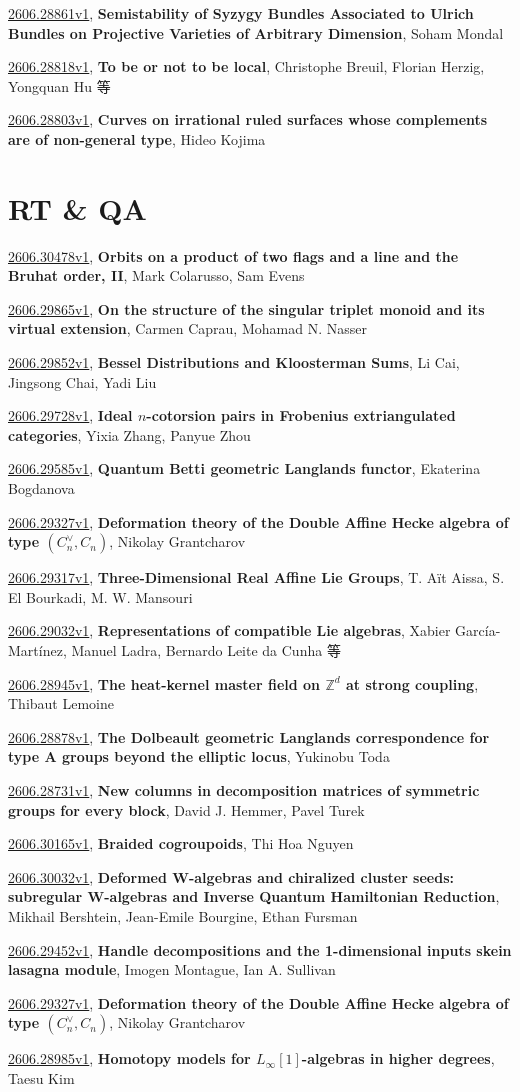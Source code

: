 \documentclass[9pt, a4paper]{article}
\theoremstyle{plain}
\theoremstyle{definition}
\theoremstyle{remark}
\newcommand{\arxiv}[3]{\href{https://arxiv.org/abs/#1}{#1}, \textbf{\textcolor{arxivblue}{#2}}, #3}
\begin{document}
\arxiv{2606.28861v1}{Semistability of Syzygy Bundles Associated to Ulrich Bundles on Projective Varieties of Arbitrary Dimension}{Soham Mondal}

\arxiv{2606.28818v1}{To be or not to be local}{Christophe Breuil, Florian Herzig, Yongquan Hu 等}

\arxiv{2606.28803v1}{Curves on irrational ruled surfaces whose complements are of non-general type}{Hideo Kojima}


\section{RT \& QA}
\arxiv{2606.30478v1}{Orbits on a product of two flags and a line and the Bruhat order, II}{Mark Colarusso, Sam Evens}

\arxiv{2606.29865v1}{On the structure of the singular triplet monoid and its virtual extension}{Carmen Caprau, Mohamad N. Nasser}

\arxiv{2606.29852v1}{Bessel Distributions and Kloosterman Sums}{Li Cai, Jingsong Chai, Yadi Liu}

\arxiv{2606.29728v1}{Ideal $n$-cotorsion pairs in Frobenius extriangulated categories}{Yixia Zhang, Panyue Zhou}

\arxiv{2606.29585v1}{Quantum Betti geometric Langlands functor}{Ekaterina Bogdanova}

\arxiv{2606.29327v1}{Deformation theory of the Double Affine Hecke algebra of type $(C_n^\vee,C_n)$}{Nikolay Grantcharov}

\arxiv{2606.29317v1}{Three-Dimensional Real Affine Lie Groups}{T. Aït Aissa, S. El Bourkadi, M. W. Mansouri}

\arxiv{2606.29032v1}{Representations of compatible Lie algebras}{Xabier García-Martínez, Manuel Ladra, Bernardo Leite da Cunha 等}

\arxiv{2606.28945v1}{The heat-kernel master field on $\mathbb{Z}^d$ at strong coupling}{Thibaut Lemoine}

\arxiv{2606.28878v1}{The Dolbeault geometric Langlands correspondence for type A groups beyond the elliptic locus}{Yukinobu Toda}

\arxiv{2606.28731v1}{New columns in decomposition matrices of symmetric groups for every block}{David J. Hemmer, Pavel Turek}

\arxiv{2606.30165v1}{Braided cogroupoids}{Thi Hoa Nguyen}

\arxiv{2606.30032v1}{Deformed W-algebras and chiralized cluster seeds: subregular W-algebras and Inverse Quantum Hamiltonian Reduction}{Mikhail Bershtein, Jean-Emile Bourgine, Ethan Fursman}

\arxiv{2606.29452v1}{Handle decompositions and the 1-dimensional inputs skein lasagna module}{Imogen Montague, Ian A. Sullivan}

\arxiv{2606.29327v1}{Deformation theory of the Double Affine Hecke algebra of type $(C_n^\vee,C_n)$}{Nikolay Grantcharov}

\arxiv{2606.28985v1}{Homotopy models for $L_{\infty}[1]$-algebras in higher degrees}{Taesu Kim}

\end{document}

